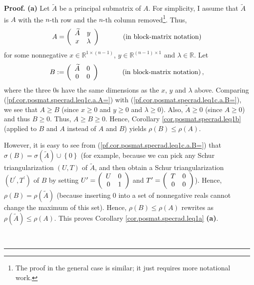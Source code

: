 \documentclass[numbers=enddot,12pt,final,onecolumn,notitlepage]{scrartcl}%
\numberwithin{exer}{subsection}
\theoremstyle{definition}
\newenvironment{proof}[1][Proof]{\noindent\textbf{#1.} }{\ \rule{0.5em}{0.5em}}
\begin{document}
\begin{proof}
\textbf{(a)} Let $\widetilde{A}$ be a principal submatrix of $A$. For
simplicity, I assume that $\widetilde{A}$ is $A$ with the $n$-th row and the
$n$-th column removed\footnote{The proof in the general case is similar; it
just requires more notational work.}. Thus,%
\begin{equation}
A=\left(
\begin{array}
[c]{cc}%
\widetilde{A} & y\\
x & \lambda
\end{array}
\right)  \ \ \ \ \ \ \ \ \ \ \left(  \text{in block-matrix notation}\right)
\label{pf.cor.posmat.specrad.leq1c.a.A=}%
\end{equation}
for some nonnegative $x\in\mathbb{R}^{1\times\left(  n-1\right)  }$,
$y\in\mathbb{R}^{\left(  n-1\right)  \times1}$ and $\lambda\in\mathbb{R}$.
Let
\begin{equation}
B:=\left(
\begin{array}
[c]{cc}%
\widetilde{A} & 0\\
0 & 0
\end{array}
\right)  \ \ \ \ \ \ \ \ \ \ \left(  \text{in block-matrix notation}\right)  ,
\label{pf.cor.posmat.specrad.leq1c.a.B=}%
\end{equation}
where the three $0$s have the same dimensions as the $x$, $y$ and $\lambda$
above. Comparing (\ref{pf.cor.posmat.specrad.leq1c.a.A=}) with
(\ref{pf.cor.posmat.specrad.leq1c.a.B=}), we see that $A\geq B$ (since
$x\geq0$ and $y\geq0$ and $\lambda\geq0$). Also, $\widetilde{A}\geq0$ (since
$A\geq0$) and thus $B\geq0$. Thus, $A\geq B\geq0$. Hence, Corollary
\ref{cor.posmat.specrad.leq1b} (applied to $B$ and $A$ instead of $A$ and $B$)
yields $\rho\left(  B\right)  \leq\rho\left(  A\right)  $.

However, it is easy to see from (\ref{pf.cor.posmat.specrad.leq1c.a.B=}) that
$\sigma\left(  B\right)  =\sigma\left(  \widetilde{A}\right)  \cup\left\{
0\right\}  $ (for example, because we can pick any Schur triangularization
$\left(  U,T\right)  $ of $\widetilde{A}$, and then obtain a Schur
triangularization $\left(  U^{\prime},T^{\prime}\right)  $ of $B$ by setting
$U^{\prime}=\left(
\begin{array}
[c]{cc}%
U & 0\\
0 & 1
\end{array}
\right)  $ and $T^{\prime}=\left(
\begin{array}
[c]{cc}%
T & 0\\
0 & 0
\end{array}
\right)  $). Hence, $\rho\left(  B\right)  =\rho\left(  \widetilde{A}\right)
$ (because inserting $0$ into a set of nonnegative reals cannot change the
maximum of this set). Hence, $\rho\left(  B\right)  \leq\rho\left(  A\right)
$ rewrites as $\rho\left(  \widetilde{A}\right)  \leq\rho\left(  A\right)  $.
This proves Corollary \ref{cor.posmat.specrad.leq1a} \textbf{(a)}. \medskip


\end{proof}
\end{document}

